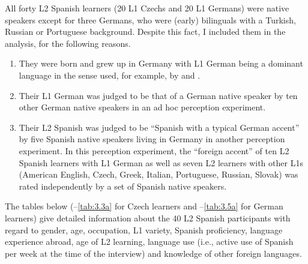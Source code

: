 All forty L2 Spanish learners (20 L1 Czechs and 20 L1 Germans) were native speakers except for three Germans, who were (early) bilinguals with a Turkish, Russian or Portuguese background. Despite this fact, I included them in the analysis, for the following reasons.



\begin{enumerate}[label={(\arabic*)}]
\item
          They were born and grew up in Germany with L1 German being a dominant language in the sense used, for example, by \citet{Grosjean1982, Grosjean2008} and \citet{Montrul2013}.



\item
          Their L1 German was judged to be that of a German native speaker by ten other German native speakers in an ad hoc perception experiment.



\item
           Their L2 Spanish was judged to be “Spanish with a typical German accent” by five Spanish native speakers living in Germany in another perception experiment. In this perception experiment, the “foreign accent” of ten L2 Spanish learners with L1 German as well as seven L2 learners with other L1s (American English, Czech, Greek, Italian, Portuguese, Russian, Slovak) was rated independently by a set of Spanish native speakers.
\end{enumerate}\largerpage[2]


The tables below (--\ref{tab:3.3a} for Czech learners and --\ref{tab:3.5a} for German learners) give detailed information about the 40 L2 Spanish participants with regard to gender, age, occupation, L1 variety, Spanish proficiency, language experience abroad, age of L2 learning, language use (i.e., active use of Spanish per week at the time of the interview) and knowledge of other foreign languages.


